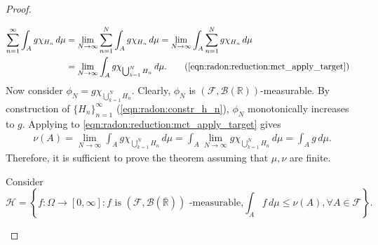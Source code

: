 \begin{proof}
\begin{step}
\begin{subequations}\label{eqn:radon:reduction:mct_apply_target}
\begin{align*}
    \sum_{n=1}^{\infty} \int_{A} g \chi_{H_n}  \,d\mu &=  \lim_{N \to \infty} \sum_{n=1}^{N} \int_{A} g \chi_{H_n}  \,d\mu = \lim_{N \to \infty} \int_{A} \sum_{n=1}^{N} g \chi_{H_n} \,d\mu & \\ 
        &= \lim_{N \to \infty} \int_{A}  g \chi_{\bigcup_{k=1}^{N} H_n}  \,d\mu.
     \tag{\ref{eqn:radon:reduction:mct_apply_target}} 
\end{align*}
\end{subequations}
Now consider $\phi_N = g \chi_{\bigcup_{k=1}^{N} H_n}$. Clearly, $\phi_N$ is $(\mathcal{F}, \mathcal{B}(\mathbb{R}))$-measurable. By construction of $\{H_n\}_{n=1}^{\infty}$ (\ref{eqn:radon:constr_h_n}), $\phi_N$ monotonically increases to $g$.
Applying  to \ref{eqn:radon:reduction:mct_apply_target} gives 
\begin{align*}
     \nu(A) = \lim_{N \to \infty} \int_{A}  g \chi_{\bigcup_{k=1}^{N} H_n}  \,d\mu 
                 = \int_{A} \lim_{N \to \infty}   g \chi_{\bigcup_{k=1}^{N} H_n}  \,d\mu
                 = \int_{A}  g  \,d\mu.
\end{align*}
Therefore, it is sufficient to prove the theorem assuming that $\mu, \nu$ are finite.
\end{step}

\begin{step}
Consider
\begin{equation*}
    \mathcal{H} = \left \{ f : \Omega \to [0, \infty] : \text{$f$ is $(\mathcal{F}, \mathcal{B}( \overline{\mathbb{R}}))$ -measurable,} \int_{A} f \,d\mu  \leq \nu(A), \forall A \in \mathcal{F} \right \}. 
\end{equation*}


\end{step}
\end{proof}
